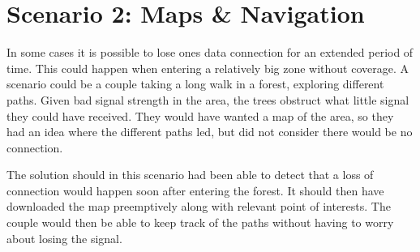 \section{Scenario 2: Maps \& Navigation}
In some cases it is possible to lose ones data connection for an extended period of time. This could happen when entering a relatively big zone without coverage. A scenario could be a couple taking a long walk in a forest, exploring different paths. Given bad signal strength in the area, the trees obstruct what little signal they could have received. They would have wanted a map of the area, so they had an idea where the different paths led, but did not consider there would be no connection.

The solution should in this scenario had been able to detect that a loss of connection would happen soon after entering the forest. It should then have downloaded the map preemptively along with relevant point of interests. The couple would then be able to keep track of the paths without having to worry about losing the signal.
